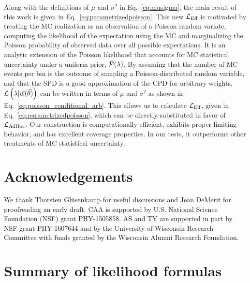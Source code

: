 Along with the definitions of $\mu$ and $\sigma^2$ in Eq.~\eqref{eq:musigma}, the main result of this work is given in Eq.~\eqref{eq:parametrizedpoisson}. This new $\mathcal{L}_\textmd{Eff}$ is motivated by treating the MC realization as an observation of a Poisson random variate, computing the likelihood of the expectation using the MC and marginalizing the Poisson probability of observed data over all possible expectations. It is an analytic extension of the Poisson likelihood that accounts for MC statistical uncertainty under a uniform prior, $\mathcal{P}(\lambda)$. By assuming that the number of MC events per bin is the outcome of sampling a Poisson-distributed random variable, and that the SPD is a good approximation of the CPD for arbitrary weights, $\mathcal{L} \left(\lambda|\vec{w}(\vec{\theta})\right)$ can be written in terms of $\mu$ and $\sigma^2$ as shown in Eq.~\eqref{eq:poisson_conditional_arb}. This allows us to calculate $\mathcal{L}_\textmd{Eff}$, given in Eq.~\eqref{eq:parametrizedpoisson}, which can be directly substituted in favor of $\mathcal{L}_{\textmd{AdHoc}}$. Our construction is computationally efficient, exhibits proper limiting behavior, and has excellent coverage properties. In our tests, it outperforms other treatments of MC statistical uncertainty.

\section*{Acknowledgements} \label{sec:ack}

We thank Thorsten Gl\"usenkamp for useful discussions and Jean DeMerit for proofreading an early draft. CAA is supported by U.S. National Science Foundation (NSF) grant PHY-1505858. AS and TY are supported in part by NSF grant PHY-1607644 and by the University of Wisconsin Research Committee with funds granted by the Wisconsin Alumni Research Foundation.




\newpage

\appendix

\ifx \standalonesupplemental\undefined
\setcounter{page}{1}
\setcounter{figure}{0}
\setcounter{table}{0}
\setcounter{equation}{0}
\fi

\renewcommand{\thepage}{Supplementary Methods and Tables -- S\arabic{page}}
\renewcommand{\figurename}{SUPPL. FIG.}
\renewcommand{\tablename}{SUPPL. TABLE}
\renewcommand{\arraystretch}{2}

\renewcommand{\theequation}{A\arabic{equation}}

\section{Summary of likelihood formulas\label{sec:appendixA}}

